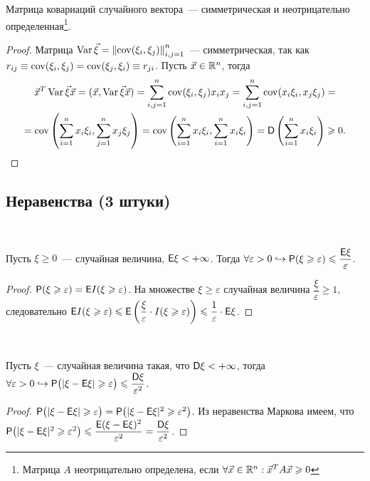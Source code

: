 \begin{lemma}
	Матрица ковариаций случайного вектора~--- симметрическая и неотрицательно определенная\footnote{Матрица $A$ неотрицательно определена, если $\forall \vec x \in \mathbb{R}^n: {\vec x}^T A \vec x \geqslant 0$}.
	\begin{proof}
		Матрица $\operatorname{Var} \vec \xi = \left\| \operatorname{cov} (\xi_i, \xi_j ) \right\|_{i, j = 1}^n$~--- симметрическая, так как $r_{ij} \equiv \operatorname{cov} ( \xi_i, \xi_j ) = \operatorname{cov} (\xi_j, \xi_i) \equiv r_{ji}$. Пусть $\vec x \in \mathbb{R}^n$, тогда 
		\begin{multline*}
			{\vec x}^T \operatorname{Var} \vec \xi \vec x = ( \vec x, \operatorname{Var} \vec \xi \vec x ) = \sum_{i,j=1}^n \operatorname{cov} (\xi_i, \xi_j ) x_i x_j = \sum_{i,j=1}^n \operatorname{cov} (x_i \xi_i, x_j \xi_j) =\\ = \operatorname{cov} \left( \sum_{i=1}^n  x_i \xi_i, \sum_{j=1}^n x_j \xi_j \right) = \operatorname{cov} \left( \sum_{i=1}^n  x_i \xi_i, \sum_{i=1}^n x_i \xi_i \right) =\mathsf{D} \left( \sum_{i=1}^n x_i \xi_i \right) \geqslant 0.
		\end{multline*}
	\end{proof}
\end{lemma}

\subsection{Неравенства (3 штуки)}
\begin{lemma}~

	Пусть $\xi \geqslant 0$~--- случайная величина, $\mathsf{E} \xi < +\infty$. Тогда $\forall \varepsilon > 0 \hookrightarrow \mathsf{P} (\xi \geqslant \varepsilon ) \leqslant \dfrac{\mathsf{E} \xi}{\varepsilon}$.
	\begin{proof}
		$\mathsf{P} (\xi \geqslant \varepsilon ) = \mathsf{E} I(\xi \geqslant \varepsilon)$. На множестве ${ \xi \geqslant \varepsilon}$ случайная величина $\dfrac{\xi}{\varepsilon} \geqslant 1$, следовательно $\mathsf{E} I(\xi \geqslant \varepsilon) \leqslant \mathsf{E} \left( \dfrac{\xi}{\varepsilon} \cdot I (\xi \geqslant \varepsilon) \right) \leqslant \dfrac{1}{\varepsilon} \cdot  \mathsf{E} \xi$.
	\end{proof}
\end{lemma}

\begin{lemma}~

	Пусть $\xi$~--- случайная величина такая, что $\mathsf{D} \xi < + \infty$, тогда $\forall \varepsilon > 0 \hookrightarrow \mathsf{P} \big(|\xi - \mathsf{E} \xi | \geqslant \varepsilon \big) \leqslant \dfrac{\mathsf{D} \xi}{\varepsilon^2}$.
	\begin{proof}
		$\mathsf{P} \big(|\xi - \mathsf{E} \xi | \geqslant \varepsilon\big) = \mathsf{P} \big( | \xi - \mathsf{E} \xi |^2 \geqslant \varepsilon^2 \big)$. Из неравенства Маркова имеем, что $\mathsf{P} \big( | \xi - \mathsf{E} \xi |^2 \geqslant \varepsilon^2 \big) \leqslant \dfrac{\mathsf{E} (\xi - \mathsf{E} \xi )^2}{\varepsilon^2} = \dfrac{\mathsf{D} \xi}{\varepsilon^2}$.
	\end{proof} 
\end{lemma}

